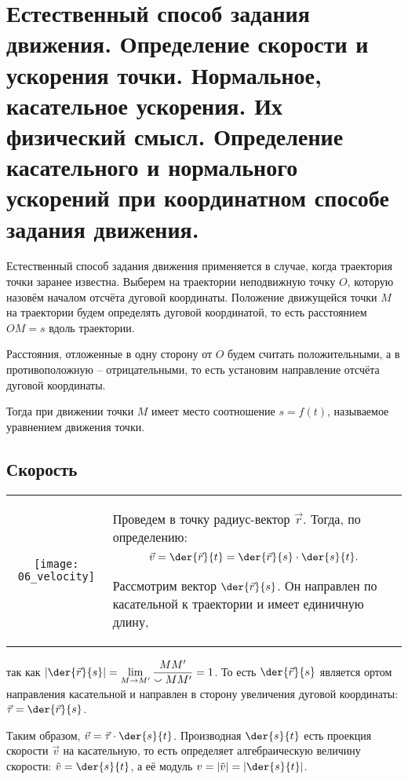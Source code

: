 \chapter{Естественный способ задания движения. Определение скорости и ускорения
точки. Нормальное, касательное ускорения. Их физический смысл. Определение
касательного и нормального ускорений при координатном способе задания движения.}

Естественный способ задания движения применяется в случае, когда траектория
точки заранее известна. Выберем на траектории неподвижную точку \( O \), которую
назовём началом отсчёта дуговой координаты. Положение движущейся точки \( M \)
на траектории будем определять дуговой координатой, то есть расстоянием
\( OM = s \) вдоль траектории.

Расстояния, отложенные в одну сторону от \( O \) будем считать положительными, а
в противоположную -- отрицательными, то есть установим направление отсчёта
дуговой координаты.

Тогда при движении точки \( M \) имеет место соотношение \( s = f(t) \),
называемое уравнением движения точки.

\section{Скорость}

\begin{table}[h!]
    \begin{tabular}{C{.4}m{.55\textwidth}}
        \texttt{[image: 06\_velocity]} &
        Проведем в точку радиус-вектор \( \vec{r} \). Тогда, по определению:
        \[
            \vec{v} = \der{\vec{r}}{t} = \der{\vec{r}}{s}\cdot\der{s}{t}.
        \]

        Рассмотрим вектор \( \ds \der{\vec{r}}{s} \). Он направлен по
        касательной к траектории и имеет единичную длину,
    \end{tabular}
\end{table}

так как \( \ds \left|\der{\vec{r}}{s}\right| = \lim_{M\to M'}\frac{MM'}
{\smallsmile MM'} = 1 \). То есть \( \ds\der{\vec{r}}{s} \) является ортом
направления касательной и направлен в сторону увеличения дуговой координаты:
\( \ds \vec{\tau} = \der{\vec{r}}{s} \).

Таким образом, \( \ds \vec{v} = \vec{\tau}\cdot\der{s}{t} \). Производная
\( \ds \der{s}{t} \) есть проекция скорости \( \vec{v} \) на касательную, то
есть определяет алгебраическую величину скорости: \( \ds \tilde{v} =
\der{s}{t} \), а её модуль \( \ds v = |\tilde{v}| = \left|\der{s}{t}\right| \).

